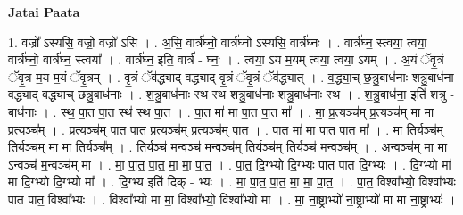 \documentclass[17pt]{extarticle}
\begin{document}
\textbf{Jatai Paata} \newline

1. वज्रो᳚ ऽस्यसि॒ वज्रो॒ वज्रो॑ ऽसि । . अ॒सि॒ वार्त्र॑घ्नो॒ वार्त्र॑घ्नो ऽस्यसि॒ वार्त्र॑घ्नः । . वार्त्र॑घ्न॒ स्त्वया॒ त्वया॒ वार्त्र॑घ्नो॒ वार्त्र॑घ्न॒ स्त्वया᳚ । . वार्त्र॑घ्न॒ इति॒ वार्त्र॑ - घ्नः॒ । . त्वया॒ ऽय म॒यम् त्वया॒ त्वया॒ ऽयम् । . अ॒यं ॅवृ॒त्रं ॅवृ॒त्र म॒य म॒यं ॅवृ॒त्रम् । . वृ॒त्रं ॅव॑द्ध्याद् वद्ध्याद् वृ॒त्रं ॅवृ॒त्रं ॅव॑द्ध्यात् । . व॒द्ध्या॒च् छ॒त्रु॒बाध॑नाः शत्रु॒बाध॑ना वद्ध्याद् वद्ध्याच् छत्रु॒बाध॑नाः । . श॒त्रु॒बाध॑नाः स्थ स्थ शत्रु॒बाध॑नाः शत्रु॒बाध॑नाः स्थ । . श॒त्रु॒बाध॑ना॒ इति॑ शत्रु - बाध॑नाः । . स्थ॒ पा॒त पा॒त स्थ॑ स्थ पा॒त । . पा॒त मा॑ मा पा॒त पा॒त मा᳚ । . मा॒ प्र॒त्यञ्च॑म् प्र॒त्यञ्च॑म् मा मा प्र॒त्यञ्च᳚म् । . प्र॒त्यञ्च॑म् पा॒त पा॒त प्र॒त्यञ्च॑म् प्र॒त्यञ्च॑म् पा॒त । . पा॒त मा॑ मा पा॒त पा॒त मा᳚ । . मा॒ ति॒र्यञ्च॑म् ति॒र्यञ्च॑म् मा मा ति॒र्यञ्च᳚म् । . ति॒र्यञ्च॑ म॒न्वञ्च॑ म॒न्वञ्च॑म् ति॒र्यञ्च॑म् ति॒र्यञ्च॑ म॒न्वञ्च᳚म् । . अ॒न्वञ्च॑म् मा मा॒ ऽन्वञ्च॑ म॒न्वञ्च॑म् मा । . मा॒ पा॒त॒ पा॒त॒ मा॒ मा॒ पा॒त॒ । . पा॒त॒ दि॒ग्भ्यो दि॒ग्भ्यः पा॑त पात दि॒ग्भ्यः । . दि॒ग्भ्यो मा॑ मा दि॒ग्भ्यो दि॒ग्भ्यो मा᳚ । . दि॒ग्भ्य इति॑ दिक् - भ्यः । . मा॒ पा॒त॒ पा॒त॒ मा॒ मा॒ पा॒त॒ । . पा॒त॒ विश्वा᳚भ्यो॒ विश्वा᳚भ्यः पात पात॒ विश्वा᳚भ्यः । . विश्वा᳚भ्यो मा मा॒ विश्वा᳚भ्यो॒ विश्वा᳚भ्यो मा । . मा॒ ना॒ष्ट्राभ्यो॑ ना॒ष्ट्राभ्यो॑ मा मा ना॒ष्ट्राभ्यः॑ । \newline
\end{document}
